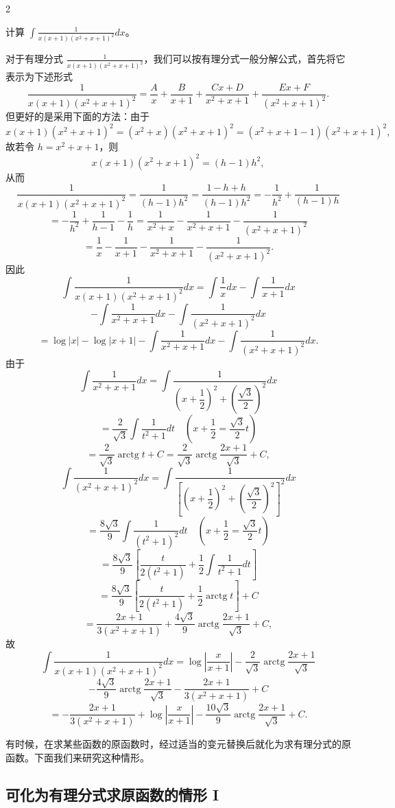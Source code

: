 \begin{sourceexample}{2}

	计算 \(\displaystyle\int\frac1{x(x+1)(x^2+x+1)^2}dx\)。

	对于有理分式 \(\displaystyle\frac1{x(x+1)(x^2+x+1)^2}\)，我们可以按有理分式一般分解公式，首先将它表示为下述形式
	\[
	\frac1{x(x+1)(x^2+x+1)^2}=\frac Ax+\frac B{x+1}+\frac{Cx+D}{x^2+x+1}+\frac{Ex+F}{(x^2+x+1)^2}.
	\]
	但更好的是采用下面的方法：由于
	\[
	x(x+1)(x^2+x+1)^2=(x^2+x)(x^2+x+1)^2=(x^2+x+1-1)(x^2+x+1)^2,
	\]
	故若令 \(h=x^2+x+1\)，则
	\[
	x(x+1)(x^2+x+1)^2=(h-1)h^2,
	\]
	从而
	\[
	\frac1{x(x+1)(x^2+x+1)^2}=\frac1{(h-1)h^2}=\frac{1-h+h}{(h-1)h^2}=-\frac1{h^2}+\frac1{(h-1)h}
	\]
	\[
	=-\frac1{h^2}+\frac1{h-1}-\frac1h=\frac1{x^2+x}-\frac1{x^2+x+1}-\frac1{(x^2+x+1)^2}
	\]
	\[
	=\frac1x-\frac1{x+1}-\frac1{x^2+x+1}-\frac1{(x^2+x+1)^2}.
	\]
	因此
	\[
	\int\frac1{x(x+1)(x^2+x+1)^2}dx=\int\frac1x dx-\int\frac1{x+1}dx
	\]
	\[
	-\int\frac1{x^2+x+1}dx-\int\frac1{(x^2+x+1)^2}dx
	\]
	\[
	=\log|x|-\log|x+1|-\int\frac1{x^2+x+1}dx-\int\frac1{(x^2+x+1)^2}dx.
	\]
	由于
	\[
	\int\frac1{x^2+x+1}dx=\int\frac1{\left(x+\dfrac12\right)^2+\left(\dfrac{\sqrt3}{2}\right)^2}dx
	\]
	\[
	=\frac2{\sqrt3}\int\frac1{t^2+1}dt\quad\left(x+\frac12=\frac{\sqrt3}{2}t\right)
	\]
	\[
	=\frac2{\sqrt3}\operatorname{arctg}t+C=\frac2{\sqrt3}\operatorname{arctg}\frac{2x+1}{\sqrt3}+C,
	\]
	\[
	\int\frac1{(x^2+x+1)^2}dx=\int\frac1{\left[\left(x+\dfrac12\right)^2+\left(\dfrac{\sqrt3}{2}\right)^2\right]^2}dx
	\]
	\[
	=\frac{8\sqrt3}{9}\int\frac1{(t^2+1)^2}dt\quad\left(x+\frac12=\frac{\sqrt3}{2}t\right)
	\]
	\[
	=\frac{8\sqrt3}{9}\left[\frac{t}{2(t^2+1)}+\frac12\int\frac1{t^2+1}dt\right]
	\]
	\[
	=\frac{8\sqrt3}{9}\left[\frac{t}{2(t^2+1)}+\frac12\operatorname{arctg}t\right]+C
	\]
	\[
	=\frac{2x+1}{3(x^2+x+1)}+\frac{4\sqrt3}{9}\operatorname{arctg}\frac{2x+1}{\sqrt3}+C,
	\]
	故
	\[
	\int\frac1{x(x+1)(x^2+x+1)^2}dx=\log\left|\frac{x}{x+1}\right|-\frac2{\sqrt3}\operatorname{arctg}\frac{2x+1}{\sqrt3}
	\]
	\[
	-\frac{4\sqrt3}{9}\operatorname{arctg}\frac{2x+1}{\sqrt3}-\frac{2x+1}{3(x^2+x+1)}+C
	\]
	\[
	=-\frac{2x+1}{3(x^2+x+1)}+\log\left|\frac{x}{x+1}\right|-\frac{10\sqrt3}{9}\operatorname{arctg}\frac{2x+1}{\sqrt3}+C.
	\]

\end{sourceexample}

有时候，在求某些函数的原函数时，经过适当的变元替换后就化为求有理分式的原函数。下面我们来研究这种情形。

\subsection{可化为有理分式求原函数的情形 I}

